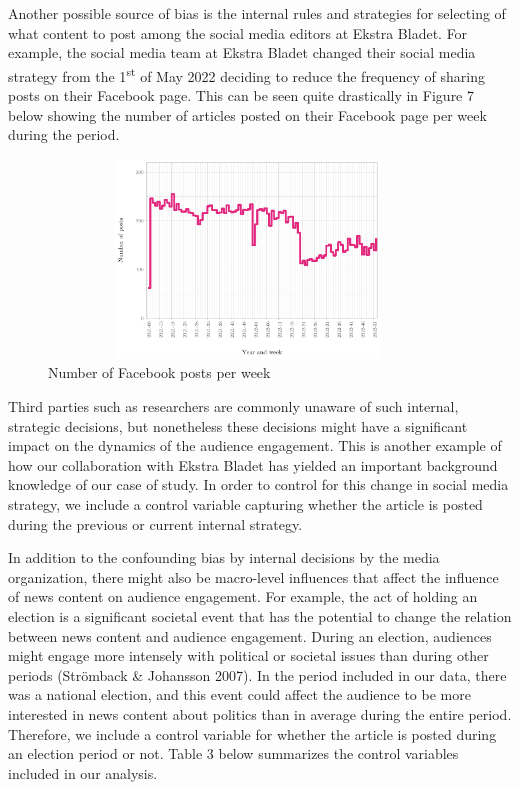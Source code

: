 \documentclass[
]{article}
\begin{document}
Another possible source of bias is the internal rules and strategies for
selecting of what content to post among the social media editors at
Ekstra Bladet. For example, the social media team at Ekstra Bladet
changed their social media strategy from the 1\textsuperscript{st} of
May 2022 deciding to reduce the frequency of sharing posts on their
Facebook page. This can be seen quite drastically in Figure 7 below
showing the number of articles posted on their Facebook page per week
during the period.

\begin{figure}[H]

{\centering \includegraphics[width=400px,height=200px]{paper_files/figure-latex/posts_per_week-1} 

}

\caption{Number of Facebook posts per week}\label{fig:posts_per_week}
\end{figure}

\noindent Third parties such as researchers are commonly unaware of such
internal, strategic decisions, but nonetheless these decisions might
have a significant impact on the dynamics of the audience engagement.
This is another example of how our collaboration with Ekstra Bladet has
yielded an important background knowledge of our case of study. In order
to control for this change in social media strategy, we include a
control variable capturing whether the article is posted during the
previous or current internal strategy.

In addition to the confounding bias by internal decisions by the media
organization, there might also be macro-level influences that affect the
influence of news content on audience engagement. For example, the act
of holding an election is a significant societal event that has the
potential to change the relation between news content and audience
engagement. During an election, audiences might engage more intensely
with political or societal issues than during other periods (Strömback
\& Johansson 2007). In the period included in our data, there was a
national election, and this event could affect the audience to be more
interested in news content about politics than in average during the
entire period. Therefore, we include a control variable for whether the
article is posted during an election period or not. Table 3 below
summarizes the control variables included in our analysis.
\end{document}
